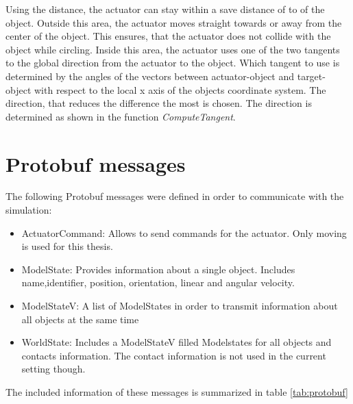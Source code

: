 Using the distance, the actuator can stay within a save distance of  to  of the object. Outside this area, the actuator moves straight towards or away from the center of the object. This ensures, that the actuator does not collide with the object while circling.
Inside this area, the actuator uses one of the two tangents to the global direction from the actuator to the object. Which tangent to use is determined by the angles of the vectors between actuator-object and target-object with respect to the local x axis of the objects coordinate system. 
The direction, that reduces the difference the most is chosen. The direction is determined as shown in the function \textit{ComputeTangent}.

\newpage

\section{Protobuf messages \label{sec:protobufMessages}}

The following Protobuf messages were defined in order to communicate with the simulation:

\begin{itemize}
\item ActuatorCommand: Allows to send commands for the actuator. Only moving is used for this thesis.
\item ModelState: Provides information about a single object. Includes name,identifier, position, orientation, linear and angular velocity.
\item ModelState\textunderscore V: A list of ModelStates in order to transmit information about all objects at the same time
\item WorldState: Includes a ModelState\textunderscore V filled Modelstates for all objects and contacts information. The contact information is not used in the current setting though.
\end{itemize}

The included information of these messages is summarized in table \ref{tab:protobuf}

